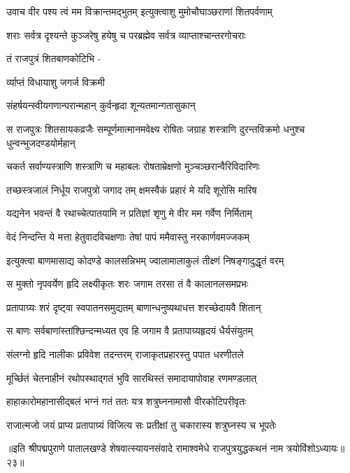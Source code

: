 \twolineshloka
{उवाच वीर पश्य त्वं मम विक्रान्तमद्भुतम्}
{इत्युक्त्वाशु मुमोचौघाञ्छराणां शितपर्वणाम्}%

\twolineshloka
{शराः सर्वत्र दृश्यन्ते कुञ्जरेषु हयेषु च}
{परब्रह्मेव सर्वत्र व्याप्ताश्चान्तरगोचराः}%

तं राजपुत्रं शितबाणकोटिभि -

र्व्याप्तं विधायाशु जगर्ज विक्रमी

\twolineshloka
{संहर्षयन्स्वीयगणान्परान्महान्}
{कुर्वन्हृदा शून्यतमान्गतासुकान्}%

\fourlineindentedshloka
{स राजपुत्रः शितसायकव्रजैः}
{सम्पूर्णमात्मानमवेक्ष्य रोषितः}
{जग्राह शस्त्राणि दुरन्तविक्रमो}
{धनुश्च धुन्वन्भुजदण्डयोर्महान्}%

\twolineshloka
{चकर्त सर्वाण्यस्त्राणि शस्त्राणि च महाबलः}
{रोषताम्रेक्षणो मुञ्चञ्छरान्वैरिविदारिणः}%

\twolineshloka
{तच्छस्त्रजालं निर्धूय राजपुत्रो जगाद तम्}
{क्षमस्वैकं प्रहारं मे यदि शूरोसि मारिष}%

\twolineshloka
{यद्यनेन भवन्तं वै रथाच्चेत्पातयामि न}
{प्रतिज्ञां शृणु मे वीर मम गर्वेण निर्मिताम्}%

\twolineshloka
{वेदं निन्दन्ति ये मत्ता हेतुवादविचक्षणाः}
{तेषां पापं ममैवास्तु नरकार्णवमज्जकम्}%

\twolineshloka
{इत्युक्त्वा बाणमासाद्य कोदण्डे कालसन्निभम्}
{ज्वालामालाकुलं तीक्ष्णं निषङ्गादुद्धृतं वरम्}%

\twolineshloka
{स मुक्तो नृपवर्येण हृदि लक्ष्यीकृतः शरः}
{जगाम तरसा तं वै कालानलसमप्रभः}%

\twolineshloka
{प्रतापाग्र्यः शरं दृष्ट्वा स्वपातनसमुद्यतम्}
{बाणान्धनुष्यथाधत्त शरच्छेदायवै शितान्}%

\twolineshloka
{स बाणः सर्वबाणांस्तांश्छिन्दन्मध्यत एव हि}
{जगाम वै प्रतापाग्र्यहृदयं धैर्यसंयुतम्}%

\twolineshloka
{संलग्नो हृदि नालीकः प्रविवेश तदन्तरम्}
{राजाकृतप्रहारस्तु पपात धरणीतले}%

\twolineshloka
{मूर्च्छितं चेतनाहीनं रथोपस्थाद्गतं भुवि}
{सारथिस्तं समादायापोवाह रणमण्डलात्}%

\twolineshloka
{हाहाकारोमहानासीद्बलं भग्नं गतं ततः}
{यत्र शत्रुघ्ननामासौ वीरकोटिपरीवृतः}%

\twolineshloka
{राजात्मजो जयं प्राप्य प्रतापाग्र्यं विजित्य सः}
{प्रतीक्षां तु चकारास्य शत्रुघ्नस्य च भूपतेः}%

॥इति श्रीपद्मपुराणे पातालखण्डे शेषवात्स्यायनसंवादे रामाश्वमेधे राजपुत्रयुद्धकथनं नाम त्रयोविंशोऽध्यायः॥२३॥

